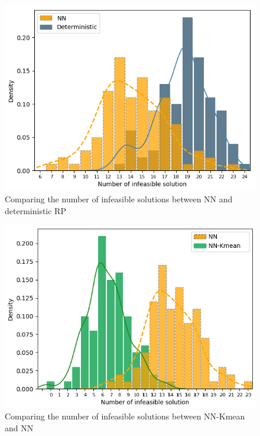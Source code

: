 \documentclass[letterpaper]{article} %
\begin{document}
\begin{figure}[t]
\centering
\includegraphics[width=0.9\columnwidth]{figure/fig5.png} %
\caption{Comparing the number of infeasible solutions between NN and deterministic RP}
\label{fig5}
\end{figure}
\begin{figure}[t]
\centering
\includegraphics[width=0.9\columnwidth]{figure/fig6.png} %
\caption{Comparing the number of infeasible solutions between NN-Kmean and NN}
\label{fig6}
\end{figure}
\end{document}
